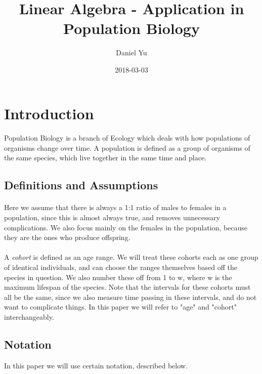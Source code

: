 \documentclass{article}
\title{Linear Algebra - Application in Population Biology}
\date{2018-03-03}
\author{Daniel Yu}
\begin{document}
\maketitle
\newpage
{}

\section{Introduction}
\paragraph{}
Population Biology is a branch of Ecology which deals with how populations of organisms change over time. A population is defined as a group of organisms of the same species, which live together in the same time and place.

\subsection{Definitions and Assumptions}
\paragraph{}
Here we assume that there is always a 1:1 ratio of males to females in a population, since this is almost always true, and removes unnecessary complications. We also focus mainly on the females in the population, because they are the ones who produce offspring.

\paragraph{}
A \textit{cohort} is defined as an age range. We will treat these cohorts each as one group of identical individuals, and can choose the ranges themselves based off the species in question. We also number these off from 1 to w, where w is the maximum lifespan of the species. Note that the intervals for these cohorts must all be the same, since we also measure time passing in these intervals, and do not want to complicate things. In this paper we will refer to "age" and "cohort" interchangeably.

\subsection{Notation}
In this paper we will use certain notation, described below. \\
\end{document}
